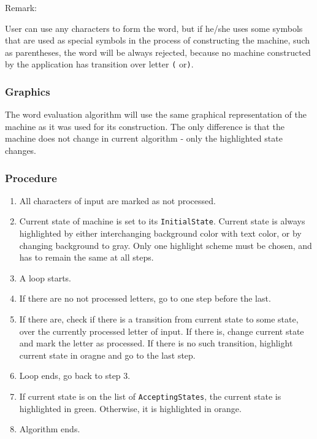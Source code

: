 \documentclass{article}
\begin{document}
Remark:

User can use any characters to form the word, but if he/she uses some symbols that are used as
special symbols in the process of constructing the machine, such as parentheses, the word will be
always rejected, because no machine constructed by the application has transition over letter
\verb|(| or\verb|)|.

\subsubsection{Graphics}

The word evaluation algorithm will use the same graphical representation of the machine as it was
used for its construction. The only difference is that the machine does not change in current
algorithm - only the highlighted state changes.

\subsubsection{Procedure}

\begin{enumerate}

  \item All characters of input are marked as not processed.

  \item Current state of machine is set to its \verb|InitialState|. Current state is always
  highlighted by either interchanging background color with text color, or by changing background to
  gray. Only one highlight scheme must be chosen, and has to remain the same at all steps.

  \item A loop starts.

  \item If there are no not processed letters, go to one step before the last. 

  \item If there are, check if there is a transition from current state to some state, over the
  currently processed letter of input. If there is, change current state and mark the letter as
  processed. If there is no such transition, highlight current state in oragne and go to the last step.

  \item Loop ends, go back to step 3.

  \item If current state is on the list of \verb|AcceptingStates|, the current state is highlighted
  in green. Otherwise, it is highlighted in orange.

  \item Algorithm ends. 

\end{enumerate}
\end{document}
